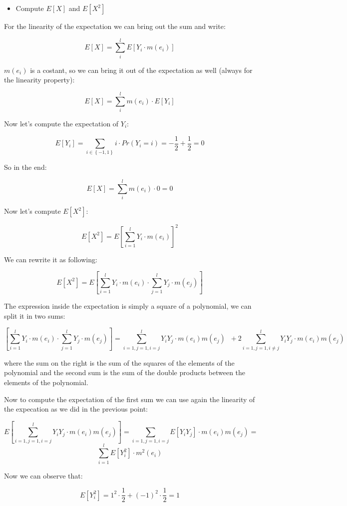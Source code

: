 \documentclass{article}
\begin{document}
\begin{itemize}
    \item Compute $E[X]$ and $E[X^2]$ \\
\end{itemize}


For the linearity of the expectation we can bring out the sum and write:

$$
E[X] = \sum_{i}^l E[Y_i \cdot m(e_i)]
$$

$m(e_i)$ is a costant, so we can bring it out of the expectation as well (always for the linearity property):

$$
E[X] = \sum_{i}^l m(e_i) \cdot E[Y_i]
$$

Now let's compute the expectation of $Y_i$:

$$
E[Y_i] = \sum_{i \in \left\{-1, 1 \right\}} i \cdot Pr(Y_i = i) = -\frac{1}{2} + \frac{1}{2} = 0
$$

So in the end:

$$
E[X] = \sum_{i}^l m(e_i) \cdot 0 = 0
$$


Now let's compute $E\left[ X^2 \right]$:


$$
E[X^2] = E \left[ \sum_{i=1}^l Y_i \cdot m(e_i) \right]^2
$$

We can rewrite it as following:

$$
E[X^2] = E \left[ \sum_{i=1}^l Y_i \cdot m(e_i)  \cdot  \sum_{j=1}^l Y_j \cdot m(e_j)    \right]
$$

The expression inside the expectation is simply a square of a polynomial, we can split it in two sums:

$$
\left[ \sum_{i=1}^l Y_i \cdot m(e_i)  \cdot  \sum_{j=1}^l Y_j \cdot m(e_j)    \right] =
\sum_{i=1, j=1, i=j}^l Y_i Y_j \cdot m(e_i) m(e_j) \; \; + 2\sum_{i=1, j=1, i \neq j}^l Y_i Y_j \cdot m(e_i) m(e_j)
$$


where the sum on the right is the sum of the squares of the elements of the polynomial and the second sum is the sum of the double products between the elements of the polynomial.

Now to compute the expectation of the first sum we can use again the linearity of the expecation as we did in the previous point:

$$
E \left[ \sum_{i=1, j=1, i=j}^l Y_i Y_j \cdot m(e_i) m(e_j) \right] =
\sum_{i=1, j=1, i=j} E[Y_i Y_j] \cdot m(e_i) m(e_j) = 
$$
$$
\sum_{i=1}^l E[Y_i^2] \cdot m^2(e_i)
$$

Now we can observe that:

$$
E[Y_i^2] = 1^2 \cdot \frac{1}{2} + (-1)^2 \cdot \frac{1}{2} = 1
$$
\end{document}
